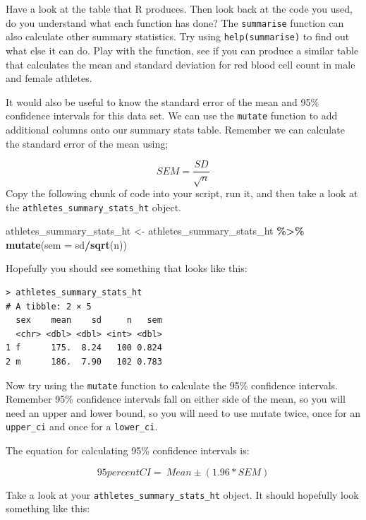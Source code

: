 \documentclass[
]{book}
\newenvironment{Shaded}{\begin{snugshade}}{\end{snugshade}}
\newcommand{\AttributeTok}[1]{\textcolor[rgb]{0.13,0.29,0.53}{#1}}
\newcommand{\FunctionTok}[1]{\textcolor[rgb]{0.13,0.29,0.53}{\textbf{#1}}}
\newcommand{\NormalTok}[1]{#1}
\newcommand{\OtherTok}[1]{\textcolor[rgb]{0.56,0.35,0.01}{#1}}
\newcommand{\SpecialCharTok}[1]{\textcolor[rgb]{0.81,0.36,0.00}{\textbf{#1}}}
\begin{document}
Have a look at the table that R produces. Then look back at the code you used, do you understand what each function has done? The \texttt{summarise} function can also calculate other summary statistics. Try using \texttt{help(summarise)} to find out what else it can do. Play with the function, see if you can produce a similar table that calculates the mean and standard deviation for red blood cell count in male and female athletes.

It would also be useful to know the standard error of the mean and 95\% confidence intervals for this data set. We can use the \texttt{mutate} function to add additional columns onto our summary stats table. Remember we can calculate the standard error of the mean using;

\[
SEM = \frac{SD}{\sqrt{n}}
\]
Copy the following chunk of code into your script, run it, and then take a look at the \texttt{athletes\_summary\_stats\_ht} object.

\begin{Shaded}
\begin{Highlighting}[]
\NormalTok{athletes\_summary\_stats\_ht }\OtherTok{\textless{}{-}}\NormalTok{ athletes\_summary\_stats\_ht }\SpecialCharTok{\%\textgreater{}\%}
  \FunctionTok{mutate}\NormalTok{(}\AttributeTok{sem =}\NormalTok{ sd}\SpecialCharTok{/}\FunctionTok{sqrt}\NormalTok{(n))}
\end{Highlighting}
\end{Shaded}

Hopefully you should see something that looks like this:

\begin{verbatim}
> athletes_summary_stats_ht
# A tibble: 2 × 5
  sex    mean    sd     n   sem 
  <chr> <dbl> <dbl> <int> <dbl>
1 f      175.  8.24   100 0.824
2 m      186.  7.90   102 0.783 
\end{verbatim}

Now try using the \texttt{mutate} function to calculate the 95\% confidence intervals. Remember 95\% confidence intervals fall on either side of the mean, so you will need an upper and lower bound, so you will need to use mutate twice, once for an \texttt{upper\_ci} and once for a \texttt{lower\_ci}.

The equation for calculating 95\% confidence intervals is:

\[
95percent CI = \ Mean ± (1.96 * SEM)
\]

Take a look at your \texttt{athletes\_summary\_stats\_ht} object. It should hopefully look something like this:
\end{document}
